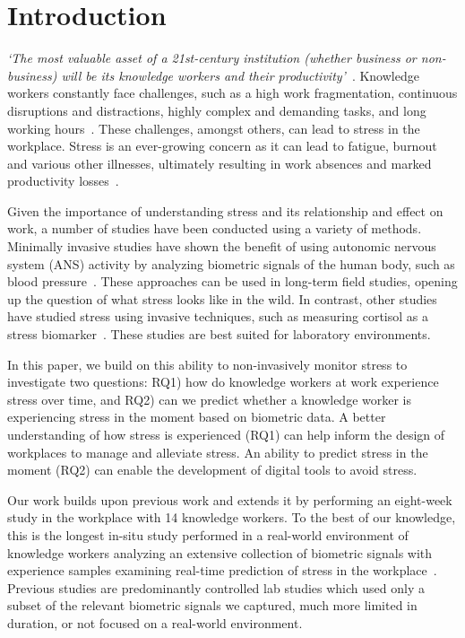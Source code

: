 \section{Introduction}

\vspace{-4mm}
\textit{`The most valuable asset of a 21st-century institution (whether 
business or non-business) will be its knowledge workers and their 
productivity'}~\cite{drucker1999knowledge}. Knowledge workers constantly face 
challenges, such as a high work fragmentation, continuous disruptions and 
distractions, highly complex and demanding tasks, and long working 
hours~\cite{gonzalez2004constant,mark2008cost,czerwinski04diary}. 
These challenges, amongst others, can lead to stress in the workplace.
Stress is an ever-growing concern as it can lead to
fatigue, burnout and various other illnesses, ultimately resulting in work 
absences and marked productivity 
losses~\cite{hockey1997stress,setz2010stress,wrs2010}.

Given the importance of understanding stress and its relationship and
effect on work, a number of studies have been conducted using a
variety of methods. Minimally invasive studies have shown the benefit of using
autonomic nervous system (ANS) activity by analyzing biometric signals
of the human body, such as blood pressure~\cite{kataoka00}.
These approaches can be used in long-term field
studies, opening up the question of what stress
looks like in the wild. 
In contrast, other studies have studied stress using invasive
techniques, such as measuring cortisol as a stress biomarker~\cite{piazza10}. These studies are best suited
for laboratory environments.

In this paper, we build on this ability to non-invasively monitor stress
to investigate two questions: RQ1) how do knowledge
workers at work experience stress over time, and RQ2) can we predict
whether a knowledge worker is experiencing stress in the moment based
on biometric data. A better understanding of how stress is experienced (RQ1)
can help inform the design of workplaces to manage
and alleviate stress. An ability to predict stress in the moment (RQ2)
can enable the development of digital tools to avoid stress. 

Our work builds upon previous work and extends it by performing an
eight-week study in the workplace with 14 knowledge 
workers. To the best of our knowledge, this is the 
longest in-situ study performed in a real-world 
environment of knowledge workers analyzing an extensive collection of biometric signals with experience samples examining real-time prediction of stress in the workplace~\cite{sano2013stress,healey2005detecting,wijsman2011towards,zuger2015interruptibility,goyal2017intelligent,Parnin2011,Nakagawa2014,Radevski2015}.
Previous studies are predominantly controlled lab studies which used only a subset of the relevant biometric signals we captured, much more limited in duration, or not focused on a real-world environment. 

